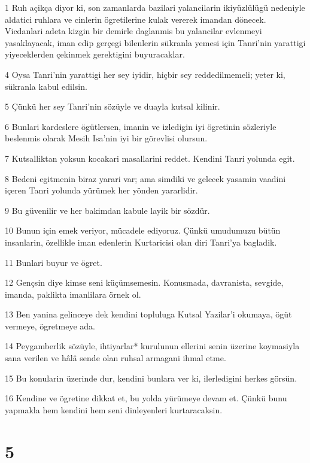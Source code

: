 \par 1 Ruh açikça diyor ki, son zamanlarda bazilari yalancilarin ikiyüzlülügü nedeniyle aldatici ruhlara ve cinlerin ögretilerine kulak vererek imandan dönecek. Vicdanlari adeta kizgin bir demirle daglanmis bu yalancilar evlenmeyi yasaklayacak, iman edip gerçegi bilenlerin sükranla yemesi için Tanri'nin yarattigi yiyeceklerden çekinmek gerektigini buyuracaklar.
\par 4 Oysa Tanri'nin yarattigi her sey iyidir, hiçbir sey reddedilmemeli; yeter ki, sükranla kabul edilsin.
\par 5 Çünkü her sey Tanri'nin sözüyle ve duayla kutsal kilinir.
\par 6 Bunlari kardeslere ögütlersen, imanin ve izledigin iyi ögretinin sözleriyle beslenmis olarak Mesih Isa'nin iyi bir görevlisi olursun.
\par 7 Kutsalliktan yoksun kocakari masallarini reddet. Kendini Tanri yolunda egit.
\par 8 Bedeni egitmenin biraz yarari var; ama simdiki ve gelecek yasamin vaadini içeren Tanri yolunda yürümek her yönden yararlidir.
\par 9 Bu güvenilir ve her bakimdan kabule layik bir sözdür.
\par 10 Bunun için emek veriyor, mücadele ediyoruz. Çünkü umudumuzu bütün insanlarin, özellikle iman edenlerin Kurtaricisi olan diri Tanri'ya bagladik.
\par 11 Bunlari buyur ve ögret.
\par 12 Gençsin diye kimse seni küçümsemesin. Konusmada, davranista, sevgide, imanda, paklikta imanlilara örnek ol.
\par 13 Ben yanina gelinceye dek kendini topluluga Kutsal Yazilar'i okumaya, ögüt vermeye, ögretmeye ada.
\par 14 Peygamberlik sözüyle, ihtiyarlar* kurulunun ellerini senin üzerine koymasiyla sana verilen ve hâlâ sende olan ruhsal armagani ihmal etme.
\par 15 Bu konularin üzerinde dur, kendini bunlara ver ki, ilerledigini herkes görsün.
\par 16 Kendine ve ögretine dikkat et, bu yolda yürümeye devam et. Çünkü bunu yapmakla hem kendini hem seni dinleyenleri kurtaracaksin.

\chapter{5}

